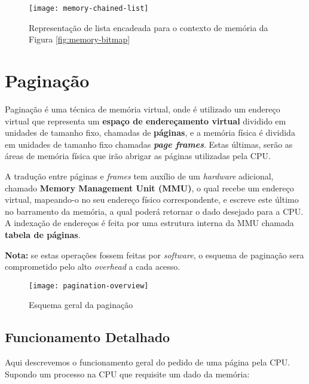 \begin{figure}[h]
  \centering
  \texttt{[image: memory-chained-list]}
  \caption{Representação de lista encadeada para o contexto de memória da Figura \ref{fig:memory-bitmap}}
  \label{fig:memory-chained-list}
\end{figure}
















\section{Paginação}
Paginação é uma técnica de memória virtual, onde é utilizado um endereço virtual que representa um \textbf{espaço de endereçamento virtual} dividido em unidades de tamanho fixo, chamadas de \textbf{páginas}, e a memória física é dividida em unidades de tamanho fixo chamadas \textbf{\textit{page frames}}. Estas últimas, serão as áreas de memória física que irão abrigar as páginas utilizadas pela CPU.

A tradução entre páginas e \textit{frames} tem auxílio de um \textit{hardware} adicional, chamado \textbf{Memory Management Unit (MMU)}, o qual recebe um endereço virtual, mapeando-o no seu endereço físico correspondente, e escreve este último no barramento da memória, a qual poderá retornar o dado desejado para a CPU. A indexação de endereços é feita por uma estrutura interna da MMU chamada \textbf{tabela de páginas}.

\textbf{Nota:} se estas operações fossem feitas por \textit{software}, o esquema de paginação sera comprometido pelo alto \textit{overhead} a cada acesso.

\begin{figure}[h]
  \centering
  \texttt{[image: pagination-overview]}
  \caption{Esquema geral da paginação}
  \label{fig:pagination}
\end{figure}


\subsection{Funcionamento Detalhado}
Aqui descrevemos o funcionamento geral do pedido de uma página pela CPU. Supondo um processo na CPU que requisite um dado da memória:

